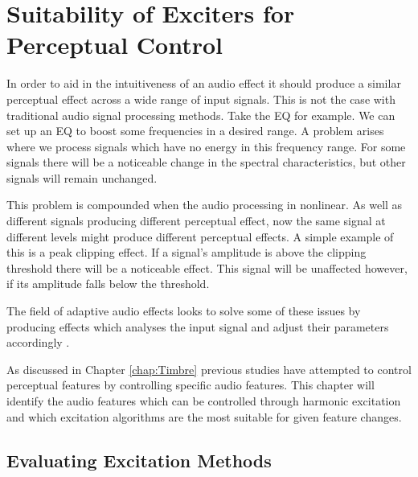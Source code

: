 
\chapter{Suitability of Exciters for Perceptual Control}
\label{chap:FeatureControl}

	In order to aid in the intuitiveness of an audio effect it should produce a similar perceptual effect across a wide range of input signals. This is not the case with traditional audio signal processing methods. Take the EQ for example. We can set up an EQ to boost some frequencies in a desired range. A problem arises where we process signals which have no energy in this frequency range. For some signals there will be a noticeable change in the spectral characteristics, but other signals will remain unchanged.

	This problem is compounded when the audio processing in nonlinear. As well as different signals producing different perceptual effect, now the same signal at different levels might produce different perceptual effects. A simple example of this is a peak clipping effect. If a signal's amplitude is above the clipping threshold there will be a noticeable effect. This signal will be unaffected however, if its amplitude falls below the threshold.


	The field of adaptive audio effects looks to solve some of these issues by producing effects which analyses the input signal and adjust their parameters accordingly .

	As discussed in Chapter \ref{chap:Timbre} previous studies have attempted to control perceptual features by controlling specific audio features. This chapter will identify the audio features which can be controlled through harmonic excitation and which excitation algorithms are the most suitable for given feature changes.

\section{Evaluating Excitation Methods}
\label{sec:FeatureControl-MethodEvaluation}

